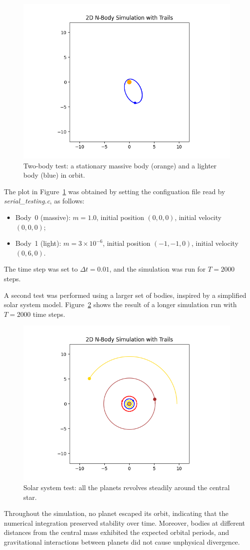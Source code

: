 \documentclass{article}
\begin{document}
\begin{figure}[H]
    \centering
    \includegraphics[width=0.6\linewidth]{2_body_orbit.png}
    \caption{Two-body test: a stationary massive body (orange) and a lighter body (blue) in orbit.}
    \label{fig:two_body_orbit}
\end{figure}
The plot in Figure~\ref{fig:two_body_orbit} was obtained by setting the configuation file read by \emph{serial\_testing.c}, as follows:
\begin{itemize}
    \item Body~0 (massive): $m = 1.0$, initial position $(0,0,0)$, initial velocity $(0,0,0)$;
    \item Body~1 (light): $m = 3\times 10^{-6}$, initial position $(-1,-1,0)$, initial velocity $(0,6,0)$.
\end{itemize}
The time step was set to $\Delta t = 0.01$, and the simulation was run for $T=2000$ steps.

A second test was performed using a larger set of bodies, inspired by a simplified solar system model.  
Figure~\ref{fig:long_solar_system} shows the result of a longer simulation run with $T = 2000$ time steps.
\begin{figure}[H]
    \centering
    \includegraphics[width=0.6\linewidth]{long_solar_system.png}
    \caption{Solar system test: all the planets revolves steadily around the central star.}
    \label{fig:long_solar_system}
\end{figure}
Throughout the simulation, no planet escaped its orbit, indicating that the numerical integration preserved stability over time.  
Moreover, bodies at different distances from the central mass exhibited the expected orbital periods, and gravitational interactions between planets did not cause unphysical divergence.
\end{document}
